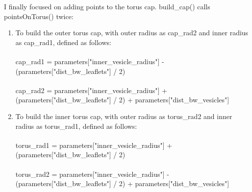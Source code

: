\documentclass[12pt, a4paper]{report}
\begin{document}
I finally focused on adding points to the torus cap. build\_cap() calls pointsOnTorus() twice: 
\begin{enumerate}
    \item To build the outer torus cap, with outer radius as cap\_rad2 and inner radius as cap\_rad1, defined as follows: 
    \\~\\ 
    cap\_rad1 = parameters["inner\_vesicle\_radius"] - 
        \\ (parameters["dist\_bw\_leaflets"] / 2)
    \\~\\
    cap\_rad2 = parameters["inner\_vesicle\_radius"] + 
        \\ (parameters["dist\_bw\_leaflets"] / 2) + parameters["dist\_bw\_vesicles"] 
    \item To build the inner torus cap, with outer radius as torus\_rad2 and inner radius as torus\_rad1, defined as follows: 
    \\~\\ 
    torus\_rad1 = parameters["inner\_vesicle\_radius"] + 
        \\ (parameters["dist\_bw\_leaflets"] / 2)
    \\~\\
    torus\_rad2 = parameters["inner\_vesicle\_radius"] - 
        \\ 
        (parameters["dist\_bw\_leaflets"] / 2) + parameters["dist\_bw\_vesicles"] 
\end{enumerate}
\end{document}
